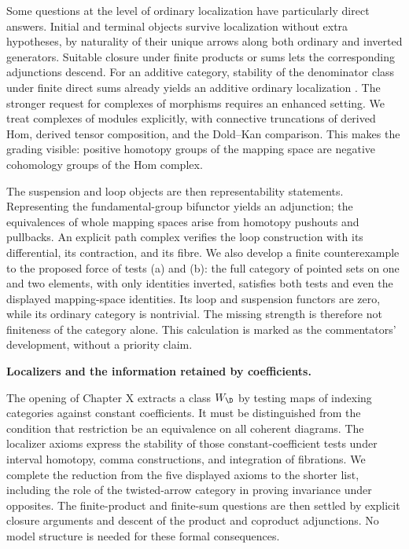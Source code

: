 Some questions at the level of ordinary localization have particularly direct answers. Initial and terminal objects survive localization without extra hypotheses, by naturality of their unique arrows along both ordinary and inverted generators. Suitable closure under finite products or sums lets the corresponding adjunctions descend. For an additive category, stability of the denominator class under finite direct sums already yields an additive ordinary localization \citep[Lemma~2.2.1]{Krause2021}. The stronger request for complexes of morphisms requires an enhanced setting. We treat complexes of modules explicitly, with connective truncations of derived Hom, derived tensor composition, and the Dold--Kan comparison. This makes the grading visible: positive homotopy groups of the mapping space are negative cohomology groups of the Hom complex.

The suspension and loop objects are then representability statements. Representing the fundamental-group bifunctor yields an adjunction; the equivalences of whole mapping spaces arise from homotopy pushouts and pullbacks. An explicit path complex verifies the loop construction with its differential, its contraction, and its fibre. We also develop a finite counterexample to the proposed force of tests (a) and (b): the full category of pointed sets on one and two elements, with only identities inverted, satisfies both tests and even the displayed mapping-space identities. Its loop and suspension functors are zero, while its ordinary category is nontrivial. The missing strength is therefore not finiteness of the category alone. This calculation is marked as the commentators' development, without a priority claim.

\medskip\noindent\textbf{Localizers and the information retained by coefficients.}

The opening of Chapter X extracts a class $W_{\D}$ by testing maps of indexing categories against constant coefficients. It must be distinguished from the condition that restriction be an equivalence on all coherent diagrams. The localizer axioms express the stability of those constant-coefficient tests under interval homotopy, comma constructions, and integration of fibrations. We complete the reduction from the five displayed axioms to the shorter list, including the role of the twisted-arrow category in proving invariance under opposites. The finite-product and finite-sum questions are then settled by explicit closure arguments and descent of the product and coproduct adjunctions. No model structure is needed for these formal consequences.

